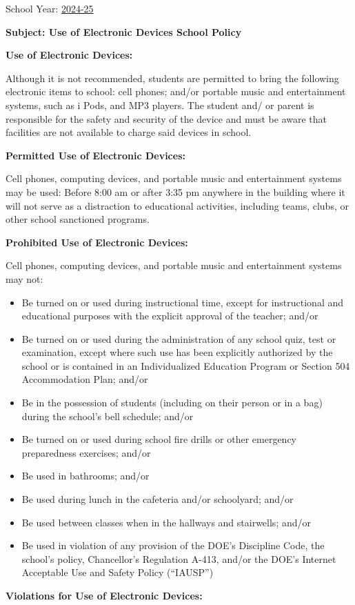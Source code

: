 \documentclass[12pt,letterpaper]{article}
\begin{document}
\vspace*{0.5in}
School Year: \href{https://www.ps192.org}{2024-25} 

\textbf{Subject: Use of Electronic Devices School Policy}

\textbf{Use of Electronic Devices:}

Although it is not recommended, students are permitted to bring the following
electronic items to school: cell phones; and/or portable music and entertainment
systems, such as i Pods, and MP3 players. The student and/ or parent is 
responsible for the safety and security of the device and must be aware that
facilities are not available to charge said devices in school.

\textbf{Permitted Use of Electronic Devices:}

Cell phones, computing devices, and portable music and entertainment systems may be used: Before 8:00 am or after 3:35 pm anywhere in the building where it will not serve as a distraction to educational activities, including teams, clubs, or other school sanctioned programs.

\textbf{Prohibited Use of Electronic Devices:}

Cell phones, computing devices, and portable music and entertainment systems may not:
\begin{itemize}
\item Be turned on or used during instructional time, except for instructional and educational purposes with the explicit approval of the teacher; and/or 
\item Be turned on or used during the administration of any school quiz, test or
examination, except where such use has been explicitly authorized by the school 
or is contained in an Individualized Education Program or Section 504
Accommodation Plan; and/or 
\item Be in the possession of students (including on their person or in a bag)
during the school’s bell schedule; and/or 
\item Be turned on or used during school fire drills or other emergency
preparedness exercises; and/or
\item Be used in bathrooms; and/or 
\item Be used during lunch in the cafeteria and/or schoolyard; and/or 
\item Be used between classes when in the hallways and stairwells; and/or 
\pagebreak
\vspace*{2cm}
\item Be used in violation of any provision of the DOE’s Discipline Code, the 
school’s policy, Chancellor’s Regulation A-413, and/or the DOE’s Internet 
Acceptable Use and Safety Policy (“IAUSP”)
\end{itemize}
\textbf{Violations for Use of Electronic Devices:}
\end{document}
